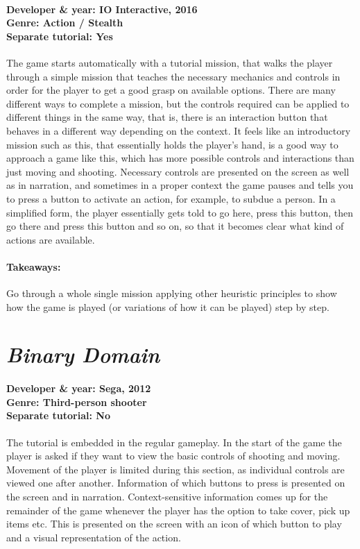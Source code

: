 \paragraph{Developer \& year: IO Interactive, 2016 \\ Genre: Action / Stealth \\ Separate tutorial: Yes \\}
The game starts automatically with a tutorial mission, that walks the player through a simple mission that teaches the necessary mechanics and controls in order for the player to get a good grasp on available options. There are many different ways to complete a mission, but the controls required can be applied to different things in the same way, that is, there is an interaction button that behaves in a different way depending on the context. It feels like an introductory mission such as this, that essentially holds the player's hand, is a good way to approach a game like this, which has more possible controls and interactions than just moving and shooting. Necessary controls are presented on the screen as well as in narration, and sometimes in a proper context the game pauses and tells you to press a button to activate an action, for example, to subdue a person. In a simplified form, the player essentially gets told to go here, press this button, then go there and press this button and so on, so that it becomes clear what kind of actions are available.
\paragraph{Takeaways:}
Go through a whole single mission applying other heuristic principles to show how the game is played (or variations of how it can be played) step by step.

\section{\textit{Binary Domain}}
\paragraph{Developer \& year: Sega, 2012 \\ Genre: Third-person shooter \\ Separate tutorial: No \\} 
The tutorial is embedded in the regular gameplay. In the start of the game the player is asked if they want to view the basic controls of shooting and moving. Movement of the player is limited during this section, as individual controls are viewed one after another. Information of which buttons to press is presented on the screen and in narration. Context-sensitive information comes up for the remainder of the game whenever the player has the option to take cover, pick up items etc. This is presented on the screen with an icon of which button to play and a visual representation of the action.
